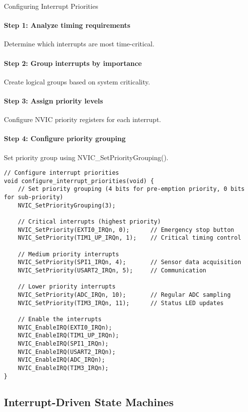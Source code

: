 \begin{KR}{Configuring Interrupt Priorities}\\
\paragraph{Step 1: Analyze timing requirements}
Determine which interrupts are most time-critical.
\paragraph{Step 2: Group interrupts by importance}
Create logical groups based on system criticality.
\paragraph{Step 3: Assign priority levels}
Configure NVIC priority registers for each interrupt.
\paragraph{Step 4: Configure priority grouping}
Set priority group using NVIC\_SetPriorityGrouping().

\begin{lstlisting}[style=basesmol]
// Configure interrupt priorities
void configure_interrupt_priorities(void) {
    // Set priority grouping (4 bits for pre-emption priority, 0 bits for sub-priority)
    NVIC_SetPriorityGrouping(3);
    
    // Critical interrupts (highest priority)
    NVIC_SetPriority(EXTI0_IRQn, 0);      // Emergency stop button
    NVIC_SetPriority(TIM1_UP_IRQn, 1);    // Critical timing control
    
    // Medium priority interrupts
    NVIC_SetPriority(SPI1_IRQn, 4);       // Sensor data acquisition
    NVIC_SetPriority(USART2_IRQn, 5);     // Communication
    
    // Lower priority interrupts
    NVIC_SetPriority(ADC_IRQn, 10);       // Regular ADC sampling
    NVIC_SetPriority(TIM3_IRQn, 11);      // Status LED updates
    
    // Enable the interrupts
    NVIC_EnableIRQ(EXTI0_IRQn);
    NVIC_EnableIRQ(TIM1_UP_IRQn);
    NVIC_EnableIRQ(SPI1_IRQn);
    NVIC_EnableIRQ(USART2_IRQn);
    NVIC_EnableIRQ(ADC_IRQn);
    NVIC_EnableIRQ(TIM3_IRQn);
}
\end{lstlisting}
\end{KR}

\subsection{Interrupt-Driven State Machines}

